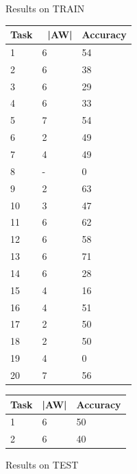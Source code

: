 \documentclass[paper=a4, fontsize=11pt]{scrartcl} %
\numberwithin{equation}{section} %
\numberwithin{figure}{section} %
\numberwithin{table}{section} %
\begin{document}
\begin{figure}[H]
\centering
\begin{minipage}{.5\textwidth}
\centering
\caption{Results on TRAIN}
\label{my-label}
\begin{tabular}{|l|l|l|}
\hline
Task & \ |AW| & Accuracy \\ \hline
1    & 6                   & 54       \\ \hline
2    & 6                   & 38       \\ \hline
3    & 6                   & 29       \\ \hline
4    & 6                   & 33       \\ \hline
5    & 7                   & 54       \\ \hline
6    & 2                   & 49       \\ \hline
7    & 4                   & 49       \\ \hline
8    & -                   & 0        \\ \hline
9    & 2                   & 63       \\ \hline
10   & 3                   & 47       \\ \hline
11   & 6                   & 62       \\ \hline
12   & 6                   & 58       \\ \hline
13   & 6                   & 71       \\ \hline
14   & 6                   & 28       \\ \hline
15   & 4                   & 16       \\ \hline
16   & 4                   & 51       \\ \hline
17   & 2                   & 50       \\ \hline
18   & 2                   & 50       \\ \hline
19   & 4                   & 0        \\ \hline
20   & 7                   & 56       \\ \hline
\end{tabular}
\end{minipage}%
\begin{minipage}{.5\textwidth}
\centering
\caption{Results on TEST}
\label{my-label}
\begin{tabular}{|l|l|l|}
\hline
Task & |AW| & Accuracy \\ \hline
1    & 6                   & 50       \\ \hline
2    & 6                   & 40       \\ \hline

\end{tabular}
\end{minipage}
\end{figure}
\end{document}
